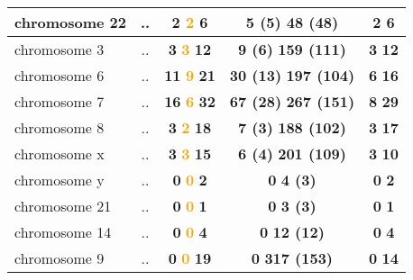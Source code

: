 \begin{table}[H]
\begin{tabular}{||l|c|c|c|c||}
\hline
chromosome 22&..&\textcolor{vert}{\textbf{2}} \textcolor{orange}{\textbf{2}} \textcolor{rose}{\textbf{6}} &\textcolor{vert}{\textbf{5 (5)}} \textcolor{rose}{\textbf{48 (48)}} &\textcolor{vert}{\textbf{2}} \textcolor{rose}{\textbf{6}} \\
\hline
chromosome 3&..&\textcolor{vert}{\textbf{3}} \textcolor{orange}{\textbf{3}} \textcolor{rose}{\textbf{12}} &\textcolor{vert}{\textbf{9 (6)}} \textcolor{rose}{\textbf{159 (111)}} &\textcolor{vert}{\textbf{3}} \textcolor{rose}{\textbf{12}} \\
\hline
chromosome 6&..&\textcolor{vert}{\textbf{11}} \textcolor{orange}{\textbf{9}} \textcolor{rose}{\textbf{21}} &\textcolor{vert}{\textbf{30 (13)}} \textcolor{rose}{\textbf{197 (104)}} &\textcolor{vert}{\textbf{6}} \textcolor{rose}{\textbf{16}} \\
\hline
chromosome 7&..&\textcolor{vert}{\textbf{16}} \textcolor{orange}{\textbf{6}} \textcolor{rose}{\textbf{32}} &\textcolor{vert}{\textbf{67 (28)}} \textcolor{rose}{\textbf{267 (151)}} &\textcolor{vert}{\textbf{8}} \textcolor{rose}{\textbf{29}} \\
\hline
chromosome 8&..&\textcolor{vert}{\textbf{3}} \textcolor{orange}{\textbf{2}} \textcolor{rose}{\textbf{18}} &\textcolor{vert}{\textbf{7 (3)}} \textcolor{rose}{\textbf{188 (102)}} &\textcolor{vert}{\textbf{3}} \textcolor{rose}{\textbf{17}} \\
\hline
chromosome x&..&\textcolor{vert}{\textbf{3}} \textcolor{orange}{\textbf{3}} \textcolor{rose}{\textbf{15}} &\textcolor{vert}{\textbf{6 (4)}} \textcolor{rose}{\textbf{201 (109)}} &\textcolor{vert}{\textbf{3}} \textcolor{rose}{\textbf{10}} \\
\hline
chromosome y&..&\textcolor{vert}{\textbf{0}} \textcolor{orange}{\textbf{0}} \textcolor{rose}{\textbf{2}} &\textcolor{vert}{\textbf{0}} \textcolor{rose}{\textbf{4 (3)}} &\textcolor{vert}{\textbf{0}} \textcolor{rose}{\textbf{2}} \\
\hline
chromosome 21&..&\textcolor{vert}{\textbf{0}} \textcolor{orange}{\textbf{0}} \textcolor{rose}{\textbf{1}} &\textcolor{vert}{\textbf{0}} \textcolor{rose}{\textbf{3 (3)}} &\textcolor{vert}{\textbf{0}} \textcolor{rose}{\textbf{1}} \\
\hline
chromosome 14&..&\textcolor{vert}{\textbf{0}} \textcolor{orange}{\textbf{0}} \textcolor{rose}{\textbf{4}} &\textcolor{vert}{\textbf{0}} \textcolor{rose}{\textbf{12 (12)}} &\textcolor{vert}{\textbf{0}} \textcolor{rose}{\textbf{4}} \\
\hline
chromosome 9&..&\textcolor{vert}{\textbf{0}} \textcolor{orange}{\textbf{0}} \textcolor{rose}{\textbf{19}} &\textcolor{vert}{\textbf{0}} \textcolor{rose}{\textbf{317 (153)}} &\textcolor{vert}{\textbf{0}} \textcolor{rose}{\textbf{14}} \\

\end{tabular}
\end{table}
